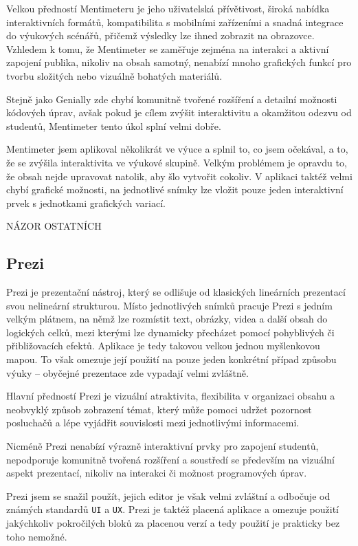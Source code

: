 Velkou předností Mentimeteru je jeho uživatelská přívětivost, široká nabídka interaktivních formátů, kompatibilita s mobilními zařízeními a snadná integrace do výukových scénářů, přičemž výsledky lze ihned zobrazit na obrazovce. 
Vzhledem k tomu, že Mentimeter se zaměřuje zejména na interakci a aktivní zapojení publika, nikoliv na obsah samotný, nenabízí mnoho grafických funkcí pro tvorbu složitých nebo vizuálně bohatých materiálů. 

Stejně jako Genially zde chybí komunitně tvořené rozšíření a detailní možnosti kódových úprav, avšak pokud je cílem zvýšit interaktivitu a okamžitou odezvu od studentů, Mentimeter tento úkol splní velmi dobře.

Mentimeter jsem aplikoval několikrát ve výuce a splnil to, co jsem očekával, a to, že se zvýšila interaktivita ve výukové skupině. 
Velkým problémem je opravdu to, že obsah nejde upravovat natolik, aby šlo vytvořit cokoliv. 
V aplikaci taktéž velmi chybí grafické možnosti, na jednotlivé snímky lze vložit pouze jeden interaktivní prvek s jednotkami grafických variací.

NÁZOR OSTATNÍCH

\subsection{Prezi}

Prezi je prezentační nástroj, který se odlišuje od klasických lineárních prezentací svou nelineární strukturou.
Místo jednotlivých snímků pracuje Prezi s jedním velkým plátnem, na němž lze rozmístit text, obrázky, videa a další obsah do logických celků, mezi kterými lze dynamicky přecházet pomocí pohyblivých či přibližovacích efektů.
Aplikace je tedy takovou velkou jednou myšlenkovou mapou.
To však omezuje její použití na pouze jeden konkrétní případ způsobu výuky -- obyčejné prezentace zde vypadají velmi zvláštně.

Hlavní předností Prezi je vizuální atraktivita, flexibilita v organizaci obsahu a neobvyklý způsob zobrazení témat, který může pomoci udržet pozornost posluchačů a lépe vyjádřit souvislosti mezi jednotlivými informacemi. 

Nicméně Prezi nenabízí výrazně interaktivní prvky pro zapojení studentů, nepodporuje komunitně tvořená rozšíření a soustředí se především na vizuální aspekt prezentací, nikoliv na interakci či možnost programových úprav.

Prezi jsem se snažil použít, jejich editor je však velmi zvláštní a odbočuje od známých standardů \texttt{UI} a \texttt{UX}.
Prezi je taktéž placená aplikace a omezuje použití jakýchkoliv pokročilých bloků za placenou verzí a tedy použití je prakticky bez toho nemožné.

